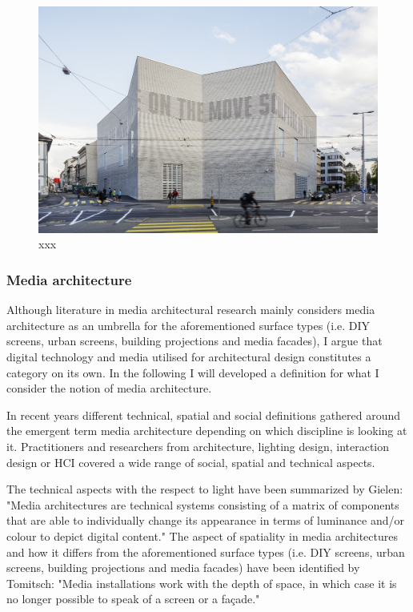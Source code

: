 \begin{figure}[htp]
\centering
\includegraphics[width=\textwidth]{Illustrations/LEDfrieze.jpg}
\caption[LED Frieze by Christ and Gantenbein (2016)]{xxx}
\label{LEDfrieze}
\end{figure}



\subsubsection{Media architecture}

Although literature in media architectural research mainly considers media architecture as an umbrella for the aforementioned surface types (i.e. DIY screens, urban screens, building projections and media facades), I argue that digital technology and media utilised for architectural design constitutes a category on its own. In the following I will developed a definition for what I consider the notion of media architecture.

In recent years different technical, spatial and social definitions gathered around the emergent term media architecture depending on which discipline is looking at it. Practitioners and researchers from architecture, lighting design, interaction design or HCI covered a wide range of social, spatial and technical aspects. 


The technical aspects with the respect to light have been summarized by Gielen: "Media architectures are technical systems consisting of a matrix of components that are able to individually change its appearance in terms of luminance and/or colour to depict digital content." 
The aspect of spatiality in media architectures and how it differs from the aforementioned surface types (i.e. DIY screens, urban screens, building projections and media facades) have been identified by Tomitsch: "Media installations work with the depth of space, in which case it is no longer possible to speak of a screen or a façade." 

